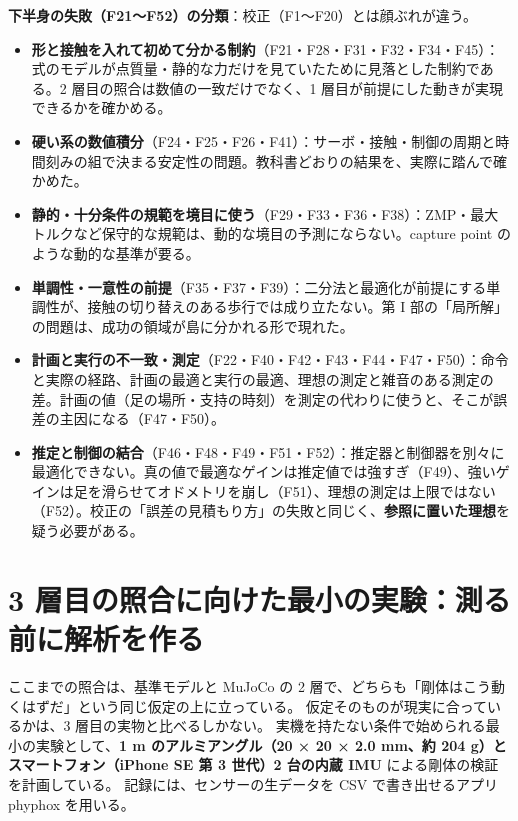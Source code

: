 \documentclass[paper=a4paper,fontsize=10pt,twocolumn,column_gap=2zw,line_length=24zw,number_of_lines=46,head_space=20mm]{jlreq}
\begin{document}
\textbf{下半身の失敗（F21〜F52）の分類}：校正（F1〜F20）とは顔ぶれが違う。
\begin{itemize}\setlength{\itemsep}{0pt}
\item \textbf{形と接触を入れて初めて分かる制約}（F21・F28・F31・F32・F34・F45）：式のモデルが点質量・静的な力だけを見ていたために見落とした制約である。2 層目の照合は数値の一致だけでなく、1 層目が前提にした動きが実現できるかを確かめる。
\item \textbf{硬い系の数値積分}（F24・F25・F26・F41）：サーボ・接触・制御の周期と時間刻みの組で決まる安定性の問題。教科書どおりの結果を、実際に踏んで確かめた。
\item \textbf{静的・十分条件の規範を境目に使う}（F29・F33・F36・F38）：ZMP・最大トルクなど保守的な規範は、動的な境目の予測にならない。capture point のような動的な基準が要る。
\item \textbf{単調性・一意性の前提}（F35・F37・F39）：二分法と最適化が前提にする単調性が、接触の切り替えのある歩行では成り立たない。第 I 部の「局所解」の問題は、成功の領域が島に分かれる形で現れた。
\item \textbf{計画と実行の不一致・測定}（F22・F40・F42・F43・F44・F47・F50）：命令と実際の経路、計画の最適と実行の最適、理想の測定と雑音のある測定の差。計画の値（足の場所・支持の時刻）を測定の代わりに使うと、そこが誤差の主因になる（F47・F50）。
\item \textbf{推定と制御の結合}（F46・F48・F49・F51・F52）：推定器と制御器を別々に最適化できない。真の値で最適なゲインは推定値では強すぎ（F49）、強いゲインは足を滑らせてオドメトリを崩し（F51）、理想の測定は上限ではない（F52）。校正の「誤差の見積もり方」の失敗と同じく、\textbf{参照に置いた理想}を疑う必要がある。
\end{itemize}


\section{3 層目の照合に向けた最小の実験：測る前に解析を作る}\label{sec:bangai}

ここまでの照合は、基準モデルと MuJoCo の 2 層で、どちらも「剛体はこう動くはずだ」という同じ仮定の上に立っている。
仮定そのものが現実に合っているかは、3 層目の実物と比べるしかない。
実機を持たない条件で始められる最小の実験として、\textbf{1 m のアルミアングル（20 × 20 × 2.0 mm、約 204 g）とスマートフォン（iPhone SE 第 3 世代）2 台の内蔵 IMU} による剛体の検証を計画している。
記録には、センサーの生データを CSV で書き出せるアプリ phyphox \cite{phyphox} を用いる。
\end{document}
